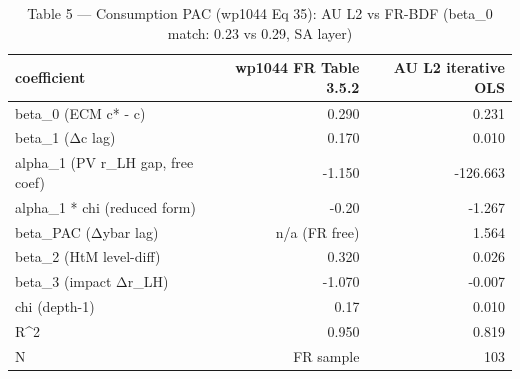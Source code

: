 \begin{table}[ht]
\centering
\caption{Table 5 — Consumption PAC (wp1044 Eq 35): AU L2 vs FR-BDF (beta_0 match: 0.23 vs 0.29, SA layer)}
\begin{tabular}{lrr}
\toprule
coefficient & wp1044 FR Table 3.5.2 & AU L2 iterative OLS \\
\midrule
beta_0 (ECM c* - c) & 0.290 & 0.231 \\
beta_1 (Δc lag) & 0.170 & 0.010 \\
alpha_1 (PV r_LH gap, free coef) & -1.150 & -126.663 \\
alpha_1 * chi (reduced form) & -0.20 & -1.267 \\
beta_PAC (Δybar lag) & n/a (FR free) & 1.564 \\
beta_2 (HtM level-diff) & 0.320 & 0.026 \\
beta_3 (impact Δr_LH) & -1.070 & -0.007 \\
chi (depth-1) & ~0.17 & 0.010 \\
R^2 & 0.950 & 0.819 \\
N & FR sample & 103 \\
\bottomrule
\end{tabular}
\end{table}
